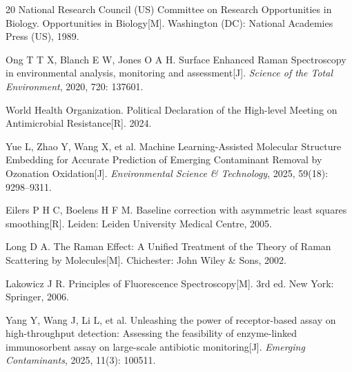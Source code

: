 \documentclass[12pt,a4paper]{article}
\begin{document}
\begin{thebibliography}{20}
 National Research Council (US) Committee on Research Opportunities in Biology. Opportunities in Biology[M]. Washington (DC): National Academies Press (US), 1989.

 Ong T T X, Blanch E W, Jones O A H. Surface Enhanced Raman Spectroscopy in environmental analysis, monitoring and assessment[J]. \textit{Science of the Total Environment}, 2020, 720: 137601.

 World Health Organization. Political Declaration of the High-level Meeting on Antimicrobial Resistance[R]. 2024.

 Yue L, Zhao Y, Wang X, et al. Machine Learning-Assisted Molecular Structure Embedding for Accurate Prediction of Emerging Contaminant Removal by Ozonation Oxidation[J]. \textit{Environmental Science \& Technology}, 2025, 59(18): 9298--9311.

 Eilers P H C, Boelens H F M. Baseline correction with asymmetric least squares smoothing[R]. Leiden: Leiden University Medical Centre, 2005.

 Long D A. The Raman Effect: A Unified Treatment of the Theory of Raman Scattering by Molecules[M]. Chichester: John Wiley \& Sons, 2002.

 Lakowicz J R. Principles of Fluorescence Spectroscopy[M]. 3rd ed. New York: Springer, 2006.

 Yang Y, Wang J, Li L, et al. Unleashing the power of receptor-based assay on high-throughput detection: Assessing the feasibility of enzyme-linked immunosorbent assay on large-scale antibiotic monitoring[J]. \textit{Emerging Contaminants}, 2025, 11(3): 100511.

\end{thebibliography}
\end{document}
